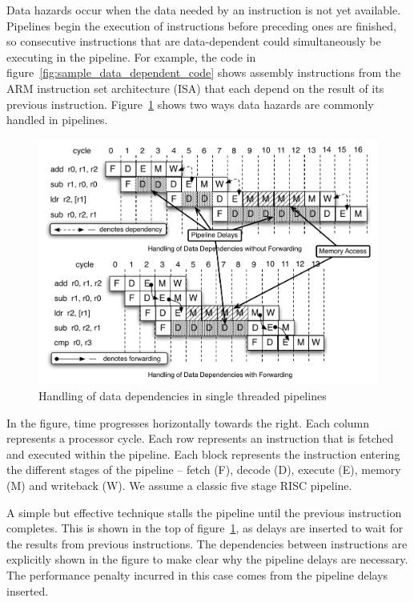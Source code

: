 Data hazards occur when the data needed by an instruction is not yet available.
Pipelines begin the execution of instructions before preceding ones are finished, so consecutive instructions that are data-dependent could simultaneously be executing in the pipeline.
For example, the code in figure~\ref{fig:sample_data_dependent_code} shows assembly instructions from the ARM instruction set architecture (ISA) that each depend on the result of its previous instruction.
Figure~\ref{fig:data_depend_execution_non_interleaved} shows two ways data hazards are commonly handled in pipelines. 

\begin{figure}
\vspace{-20pt} 
\begin{center}
\includegraphics[scale=.6]{figs/data_depend_execution_non_interleaved}
\end{center}
\vspace{-3mm}
\caption{Handling of data dependencies in single threaded pipelines}
\label{fig:data_depend_execution_non_interleaved}
\end{figure}

In the figure, time progresses horizontally towards the right.
Each column represents a processor cycle.
Each row represents an instruction that is fetched and executed within the pipeline.
Each block represents the instruction entering the different stages of the pipeline -- fetch (F), decode (D), execute (E), memory (M) and writeback (W).   
We assume a classic five stage RISC pipeline.

A simple but effective technique stalls the pipeline until the previous instruction completes.
This is shown in the top of figure~\ref{fig:data_depend_execution_non_interleaved}, as delays are inserted to wait for the results from previous instructions.
The dependencies between instructions are explicitly shown in the figure to make clear why the pipeline delays are necessary.
The performance penalty incurred in this case comes from the pipeline delays inserted.

